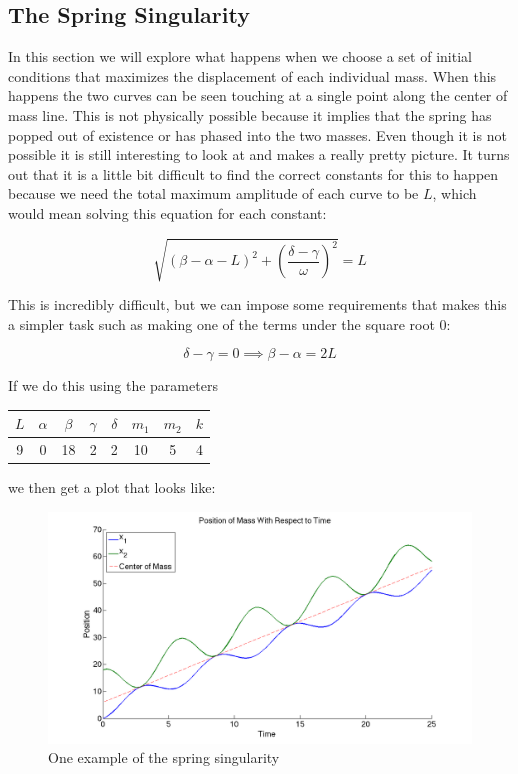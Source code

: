 \documentclass[11pt, oneside]{article}   	%
\begin{document}
\subsection{The Spring Singularity}
In this section we will explore what happens when we choose a set of initial conditions that maximizes the displacement of each individual mass.
When this happens the two curves can be seen touching at a single point along the center of mass line.
This is not physically possible because it implies that the spring has popped out of existence or has phased into the two masses.
Even though it is not possible it is still interesting to look at and makes a really pretty picture.
It turns out that it is a little bit difficult to find the correct constants for this to happen because we need the total maximum amplitude of each curve to be $L$, which would mean solving this equation for each constant:

$$\sqrt{(\beta - \alpha -L)^2 + \left(\frac{\delta - \gamma}{\omega}\right)^2}=L$$

This is incredibly difficult, but we can impose some requirements that makes this a simpler task such as making one of the terms under the square root $0$:

$$\delta - \gamma = 0 \implies \beta - \alpha = 2L$$

If we do this using the parameters

\begin{center}

\begin{tabular}{| c | c | c | c | c | c | c | c |}

\hline

$L$ & $\alpha$ & $\beta$ & $\gamma$ & $\delta$ & $m_1$ & $m_2$ & $k$ \\

\hline

 9 & 0 & 18 & 2 & 2 & 10 & 5 & 4\\

\hline

\end{tabular}

\end{center}

we then get a plot that looks like: \\

\begin{figure}[h!]
\centering \includegraphics[scale=0.3]{spring_sing}
\caption{\label{singularity}One example of the spring singularity}
\end{figure}
\end{document}
